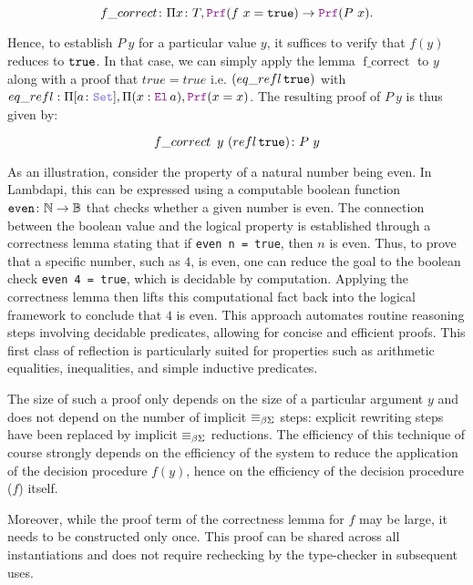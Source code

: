\begin{equation*}
\mathop{f\_correct} \colon \Pi x \colon T, \prf (f~x = \tt{true}) \ra \prf (P~x).
\end{equation*}

Hence, to establish $P~y$ for a particular value $y$, it suffices to verify that $f(y)$ reduces to  $\tt{true}$.
In that case, we can simply apply the lemma $\mathop{f\_correct}$ to $y$ along with a proof that $true = true$ i.e. $(\mathop{eq\_refl} \tt{true})$ with $eq\_refl: \Pi [a \colon \set], \Pi (x: \el\,a), \prf (x = x)$. 
The resulting proof of $P~y$ is thus given by:

\begin{equation*}
\mathop{f\_correct} ~y~ (\mathop{refl} \tt{true}) \colon P~y
\end{equation*}

As an illustration, consider the property of a natural number being even. In Lambdapi, this can be expressed using a computable boolean function $\texttt{even} \colon \N \ra \B$ that checks whether a given number is even.
The connection between the boolean value and the logical property is established through a correctness lemma stating that if \texttt{even n = true}, then $n$ is even.
Thus, to prove that a specific number, such as $4$, is even, one can reduce the goal to the boolean check \texttt{even 4 = true}, which is decidable by computation.
Applying the correctness lemma then lifts this computational fact back into the logical framework to conclude that $4$ is even.
This approach automates routine reasoning steps involving decidable predicates, allowing for concise and efficient proofs.
This first class of reflection is particularly suited for properties such as arithmetic equalities, inequalities, and simple inductive predicates.

The size of such a proof only depends on the size of a particular argument $y$ and does not depend on the number of implicit $\equivL$ steps: explicit rewriting steps have been replaced by implicit $\equivL$ reductions.
The efficiency of this technique of course strongly depends on the efficiency of the system to reduce the application of the decision procedure $f(y)$, hence on the efficiency of the decision procedure ($f$) itself.


Moreover, while the proof term of the correctness lemma for $f$ may be large, it needs to be constructed only once. This proof can be shared across all instantiations and does not require rechecking by the type-checker in subsequent uses.

